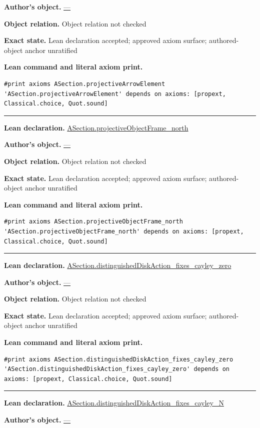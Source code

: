 \documentclass[11pt]{article}
\theoremstyle{plain}
\theoremstyle{definition}
\theoremstyle{remark}
\begin{document}
\begin{tcolorbox}
\par\textbf{Author's object.} \url{—}
\par\textbf{Object relation.} Object relation not checked
\par\textbf{Exact state.} Lean declaration accepted; approved axiom surface; authored-object anchor unratified
\par\smallskip\textbf{Lean command and literal axiom print.}
\begin{Verbatim}[breaklines=true,breakanywhere=true,fontsize=\small]
#print axioms ASection.projectiveArrowElement
'ASection.projectiveArrowElement' depends on axioms: [propext, Classical.choice, Quot.sound]
\end{Verbatim}
\medskip\hrule\medskip
\textbf{Lean declaration.} \url{ASection.projectiveObjectFrame_north}
\par\textbf{Author's object.} \url{—}
\par\textbf{Object relation.} Object relation not checked
\par\textbf{Exact state.} Lean declaration accepted; approved axiom surface; authored-object anchor unratified
\par\smallskip\textbf{Lean command and literal axiom print.}
\begin{Verbatim}[breaklines=true,breakanywhere=true,fontsize=\small]
#print axioms ASection.projectiveObjectFrame_north
'ASection.projectiveObjectFrame_north' depends on axioms: [propext, Classical.choice, Quot.sound]
\end{Verbatim}
\medskip\hrule\medskip
\textbf{Lean declaration.} \url{ASection.distinguishedDiskAction_fixes_cayley_zero}
\par\textbf{Author's object.} \url{—}
\par\textbf{Object relation.} Object relation not checked
\par\textbf{Exact state.} Lean declaration accepted; approved axiom surface; authored-object anchor unratified
\par\smallskip\textbf{Lean command and literal axiom print.}
\begin{Verbatim}[breaklines=true,breakanywhere=true,fontsize=\small]
#print axioms ASection.distinguishedDiskAction_fixes_cayley_zero
'ASection.distinguishedDiskAction_fixes_cayley_zero' depends on axioms: [propext, Classical.choice, Quot.sound]
\end{Verbatim}
\medskip\hrule\medskip
\textbf{Lean declaration.} \url{ASection.distinguishedDiskAction_fixes_cayley_N}
\par\textbf{Author's object.} \url{—}

\end{tcolorbox}
\end{document}

